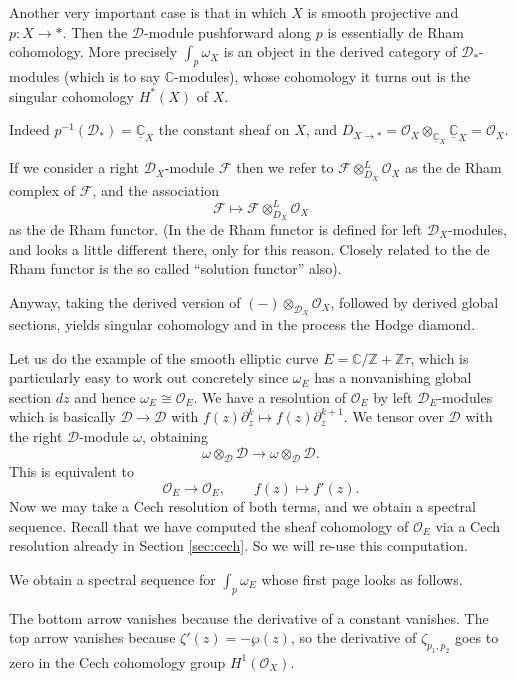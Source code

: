 \documentclass[12pt]{article}
\theoremstyle{plain}
\theoremstyle{definition}
\numberwithin{equation}{section}
\newcommand{\C}{\mathbb{C}}
\newcommand{\Z}{\mathbb{Z}}
\newcommand{\CD}{\mathcal{D}}
\newcommand{\CF}{\mathcal{F}}
\newcommand{\OO}{\mathcal{O}}
\begin{document}
{\color{blue}Another very important case is that in which $X$ is smooth projective and $p : X \rightarrow *$. Then the $\CD$-module pushforward along $p$ is essentially de Rham cohomology. More precisely $\int_p \omega_X$ is an object in the derived category of $\CD_*$-modules (which is to say $\C$-modules), whose cohomology it turns out is the singular cohomology $H^*(X)$ of $X$.

Indeed $p^{-1}(\CD_*) = \underline{\C}_X$ the constant sheaf on $X$, and $D_{X \rightarrow *} = \OO_X \otimes_{\underline{\C}_X} \underline{\C}_X = \OO_X$.

If we consider a right $\CD_X$-module $\CF$ then we refer to $\CF \otimes^L_{D_X} \OO_{X}$ as the de Rham complex of $\CF$, and the association
\[
\CF \mapsto \CF \otimes^L_{D_X} \OO_{X}
\]
as the de Rham functor. (In {\cite[Section 4.2]{HTT}} the de Rham functor is defined for left $\CD_X$-modules, and looks a little different there, only for this reason. Closely related to the de Rham functor is the so called ``solution functor'' also).

Anyway, taking the derived version of $(-) \otimes_{\CD_X} \OO_X$, followed by derived global sections, yields singular cohomology and in the process the Hodge diamond.

Let us do the example of the smooth elliptic curve $E = \C / \Z + \Z \tau$, which is particularly easy to work out concretely since $\omega_E$ has a nonvanishing global section $dz$ and hence $\omega_E \cong \OO_E$. We have a resolution of $\OO_E$ by left $\CD_E$-modules which is basically $\CD \rightarrow \CD$ with $f(z) \partial_z^k \mapsto f(z) \partial_z^{k+1}$. We tensor over $\CD$ with the right $\CD$-module $\omega$, obtaining
\[
\omega \otimes_{\CD} \CD \rightarrow \omega \otimes_{\CD} \CD.
\]
This is equivalent to
\[
\OO_E \rightarrow \OO_E, \qquad f(z) \mapsto f'(z).
\]
Now we may take a Cech resolution of both terms, and we obtain a spectral sequence. Recall that we have computed the sheaf cohomology of $\OO_E$ via a Cech resolution already in Section \ref{sec:cech}. So we will re-use this computation.

We obtain a spectral sequence for $\int_p \omega_E$ whose first page looks as follows.
\begin{figure}[htp]
\begin{center}
\end{center}
\end{figure}
The bottom arrow vanishes because the derivative of a constant vanishes. The top arrow vanishes because $\zeta'(z) = -\wp(z)$, so the derivative of $\zeta_{p_1, p_2}$ goes to zero in the Cech cohomology group $H^1(\OO_X)$.

}
\end{document}
